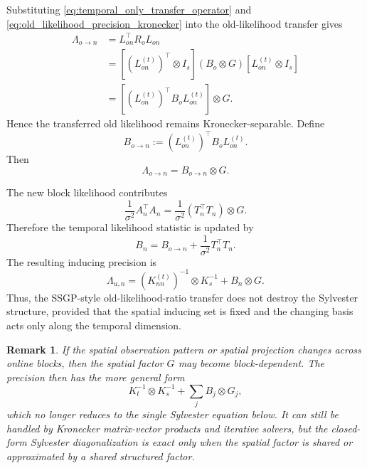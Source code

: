\documentclass[12pt]{article}
\newtheorem{remark}{Remark}
\begin{document}
Substituting \eqref{eq:temporal_only_transfer_operator} and
\eqref{eq:old_likelihood_precision_kronecker} into the old-likelihood transfer gives
\begin{align}
    \Lambda_{o\rightarrow n}
    &=
    L_{on}^\top R_oL_{on} \\
    &=
    \left[
        \left(L_{on}^{(t)}\right)^\top
        \otimes I_s
    \right]
    (B_o\otimes G)
    \left[
        L_{on}^{(t)}\otimes I_s
    \right] \\
    &=
    \left[
        \left(L_{on}^{(t)}\right)^\top
        B_o
        L_{on}^{(t)}
    \right]
    \otimes G.
\end{align}
Hence the transferred old likelihood remains Kronecker-separable. Define
\begin{equation}
    B_{o\rightarrow n}
    :=
    \left(L_{on}^{(t)}\right)^\top
    B_o
    L_{on}^{(t)}.
    \label{eq:transferred_temporal_likelihood_statistic}
\end{equation}
Then
\begin{equation}
    \Lambda_{o\rightarrow n}
    =
    B_{o\rightarrow n}\otimes G.
    \label{eq:kronecker_old_likelihood_transfer}
\end{equation}

The new block likelihood contributes
\begin{equation}
    \frac{1}{\sigma^2}A_n^\top A_n
    =
    \frac{1}{\sigma^2}
    (T_n^\top T_n)\otimes G.
\end{equation}
Therefore the temporal likelihood statistic is updated by
\begin{equation}
    B_n
    =
    B_{o\rightarrow n}
    +
    \frac{1}{\sigma^2}T_n^\top T_n.
    \label{eq:temporal_stat_ssgp_transfer}
\end{equation}
The resulting inducing precision is
\begin{equation}
    \Lambda_{u,n}
    =
    \left(K_{nn}^{(t)}\right)^{-1}
    \otimes
    K_s^{-1}
    +
    B_n\otimes G.
    \label{eq:kronecker_precision_after_ssgp_transfer}
\end{equation}
Thus, the SSGP-style old-likelihood-ratio transfer does not destroy the Sylvester
structure, provided that the spatial inducing set is fixed and the changing basis acts
only along the temporal dimension.

\begin{remark}
If the spatial observation pattern or spatial projection changes across online blocks, then
the spatial factor \(G\) may become block-dependent. The precision then has the more
general form
\[
    K_t^{-1}\otimes K_s^{-1}
    +
    \sum_j B_j\otimes G_j,
\]
which no longer reduces to the single Sylvester equation below. It can still be handled by
Kronecker matrix-vector products and iterative solvers, but the closed-form Sylvester
diagonalization is exact only when the spatial factor is shared or approximated by a
shared structured factor.
\end{remark}
\end{document}
